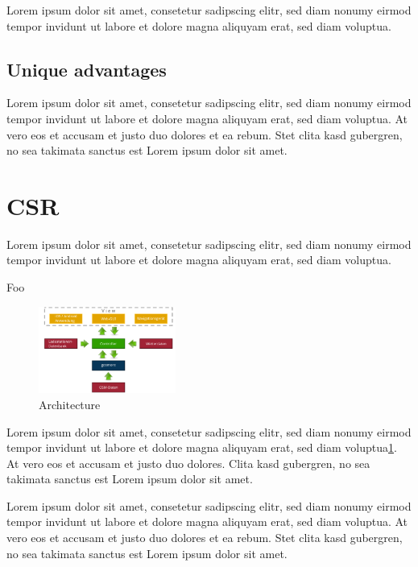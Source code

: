 \documentclass{proposal}
\makeatletter
\renewcommand{\paragraph}{
  \@startsection{paragraph}{4}
    {\z@}{1.25ex \@plus 1ex \@minus .2ex}{-1em}
      {\normalfont\normalsize\bfseries}
      }
\makeatother
\begin{document}
Lorem ipsum dolor sit amet, consetetur sadipscing elitr, sed diam nonumy
eirmod tempor invidunt ut labore et dolore magna aliquyam erat, sed diam
voluptua. 

\subsection*{Unique advantages}
Lorem ipsum dolor sit amet, consetetur sadipscing elitr, sed diam nonumy
eirmod tempor invidunt ut labore et dolore magna aliquyam erat, sed diam
voluptua. At vero eos et accusam et justo duo dolores et ea rebum. Stet
clita kasd gubergren, no sea takimata sanctus est Lorem ipsum dolor sit
amet.


\section*{CSR}
Lorem ipsum dolor sit amet, consetetur sadipscing elitr, sed diam nonumy
eirmod tempor invidunt ut labore et dolore magna aliquyam erat, sed diam
voluptua. 

\paragraph{Foo}
\begin{figure}[h]
        \centering
        \includegraphics[width=0.4\textwidth]{images/BlockDiagram}
        \caption{Architecture}
        \label{fig:archDiagram}
\end{figure}

Lorem ipsum dolor sit amet, consetetur sadipscing elitr, sed diam nonumy
eirmod tempor invidunt ut labore et dolore magna aliquyam erat, sed diam
voluptua\ref{fig:archDiagram}. At vero eos et accusam et justo duo dolores.
Clita kasd gubergren, no sea takimata sanctus est Lorem ipsum dolor sit
amet.

Lorem ipsum dolor sit amet, consetetur sadipscing elitr, sed diam nonumy
eirmod tempor invidunt ut labore et dolore magna aliquyam erat, sed diam
voluptua. At vero eos et accusam et justo duo dolores et ea rebum. Stet
clita kasd gubergren, no sea takimata sanctus est Lorem ipsum dolor sit
amet.
\end{document}
